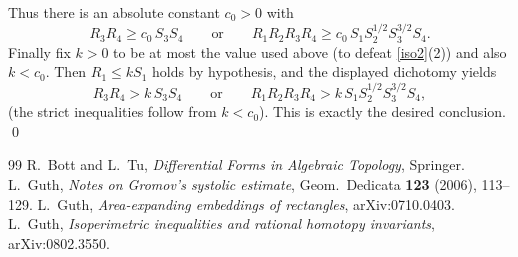 Thus there is an absolute constant $c_0>0$ with
\[
R_3R_4\ge c_0\,S_3S_4\qquad\text{or}\qquad R_1R_2R_3R_4\ge c_0\,S_1S_2^{1/2}S_3^{3/2}S_4 .
\]
Finally fix $k>0$ to be at most the value used above (to defeat \eqref{iso2}(2)) and also $k<c_0$. Then $R_1\le kS_1$ holds by hypothesis, and the displayed dichotomy yields
\[
R_3R_4> k\,S_3S_4\qquad\text{or}\qquad R_1R_2R_3R_4> k\,S_1S_2^{1/2}S_3^{3/2}S_4,
\]
(the strict inequalities follow from $k<c_0$). This is exactly the desired conclusion.
\qed

\begin{thebibliography}{99}
 R.\ Bott and L.\ Tu, \emph{Differential Forms in Algebraic Topology}, Springer.
 L.\ Guth, \emph{Notes on Gromov's systolic estimate}, Geom.\ Dedicata \textbf{123} (2006), 113--129.
 L.\ Guth, \emph{Area-expanding embeddings of rectangles}, arXiv:0710.0403.
 L.\ Guth, \emph{Isoperimetric inequalities and rational homotopy invariants}, arXiv:0802.3550.
\end{thebibliography}